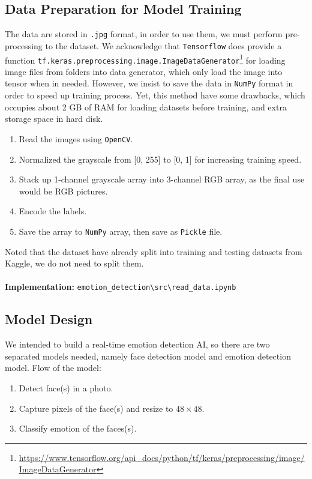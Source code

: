 \documentclass[11pt,a4paper]{article}
\begin{document}
    \subsection{Data Preparation for Model Training}
    The data are stored in \texttt{.jpg} format, in order to use them, we must perform pre-processing to the dataset. We acknowledge that \texttt{Tensorflow} does provide a function \texttt{tf.keras.preprocessing.image.ImageDataGenerator}\footnote{\url{https://www.tensorflow.org/api_docs/python/tf/keras/preprocessing/image/ImageDataGenerator}} for loading image files from folders into data generator, which only load the image into tensor when in needed. However, we insist to save the data in \texttt{NumPy} format in order to speed up training process. Yet, this method have some drawbacks, which occupies about 2 GB of RAM for loading datasets before training, and extra storage space in hard disk.
    \begin{enumerate}
        \item Read the images using \texttt{OpenCV}.
        \item Normalized the grayscale from [0, 255] to [0, 1] for increasing training speed.
        \item Stack up 1-channel grayscale array into 3-channel RGB array, as the final use would be RGB pictures.
        \item Encode the labels.
        \item Save the array to \texttt{NumPy} array, then save as \texttt{Pickle} file.
    \end{enumerate}
    Noted that the dataset have already split into training and testing datasets from Kaggle, we do not need to split them. \\
    \\
    \textbf{Implementation:} \texttt{emotion\_detection\textbackslash src\textbackslash read\_data.ipynb}
        
    
    
    \subsection{Model Design}
    We intended to build a real-time emotion detection AI, so there are two separated models needed, namely face detection model and emotion detection model. Flow of the model:
    \begin{enumerate}
        \item Detect face(s) in a photo.
        \item Capture pixels of the face(s) and resize to $48 \times 48$.
        \item Classify emotion of the faces(s).
    \end{enumerate}
    
\end{document}
